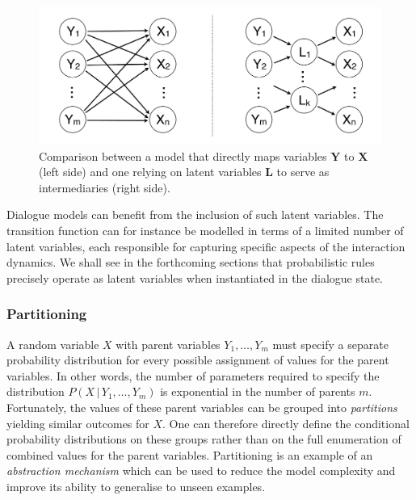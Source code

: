  \begin{figure}[h]
\centering
\includegraphics[scale=0.25]{imgs/latentvariables.pdf}
\caption{Comparison between a model that directly maps variables $\mathbf{Y}$ to $\mathbf{X}$ (left side) and one relying on latent variables $\mathbf{L}$ to serve as intermediaries (right side).}
\label{fig:latentvariables}
\end{figure}

Dialogue models can benefit from the inclusion of such latent variables. The transition function can for instance be modelled in terms of a limited number of latent variables, each responsible for capturing specific aspects of the interaction dynamics.  We shall see in the forthcoming sections that probabilistic rules precisely operate as latent variables when instantiated in the dialogue state. 

\subsubsection*{Partitioning}

A random variable $X$ with parent variables $Y_1,\dots, Y_m$ must specify a separate probability distribution for every possible assignment of values for the parent variables. In other words, the number of parameters required to specify the distribution $P(X \, | \, Y_1, \dots, Y_m)$ is exponential in the number of parents $m$. Fortunately, the values of these parent variables can be grouped into \textit{partitions} yielding similar outcomes for $X$. One can therefore directly define the conditional probability distributions on these groups rather than on the full enumeration of combined values for the parent variables. Partitioning is an example of an \textit{abstraction mechanism} which can be used to reduce the model complexity and improve its ability to generalise to unseen examples. 


